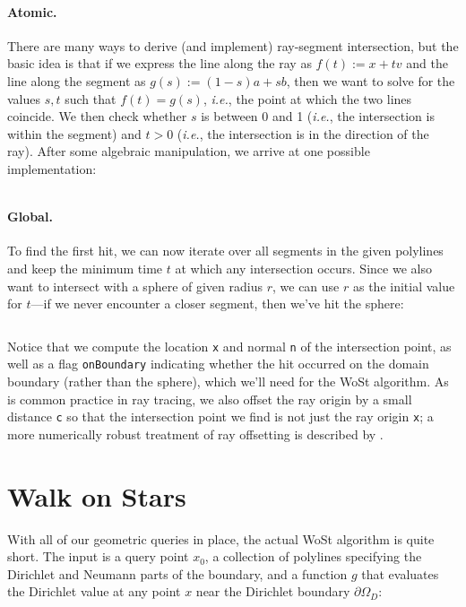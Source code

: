 \documentclass{article}
\newcommand{\code}[1]{\texttt{\small{#1}}}
\newcommand{\ie}{\emph{i.e.}} %
\renewcommand{\vec}[1]{#1}
\begin{document}
\paragraph{Atomic.} There are many ways to derive (and implement) ray-segment intersection, but the basic idea is that if we express the line along the ray as \(\vec{f}(t) := \vec{x} + t\vec{v}\) and the line along the segment as \(\vec{g}(s) := (1-s)\vec{a} + s\vec{b}\), then we want to solve for the values \(s,t\) such that \(\vec{f}(t) = \vec{g}(s)\), \ie, the point at which the two lines coincide.  We then check whether \(s\) is between 0 and 1 (\ie, the intersection is within the segment) and \(t > 0\) (\ie, the intersection is in the direction of the ray).  After some algebraic manipulation, we arrive at one possible implementation:

\inputminted[fontsize=\small,linenos,firstline=48,lastline=60,bgcolor=bg]{cpp}{../code/WoStLaplace2D.cpp}

\paragraph{Global.} To find the first hit, we can now iterate over all segments in the given polylines and keep the minimum time \(t\) at which any intersection occurs.  Since we also want to intersect with a sphere of given radius \(r\), we can use \(r\) as the initial value for \(t\)---if we never encounter a closer segment, then we've hit the sphere:

\inputminted[fontsize=\small,linenos,firstline=90,lastline=113,bgcolor=bg]{cpp}{../code/WoStLaplace2D.cpp}

Notice that we compute the location \code{x} and normal \code{n} of the intersection point, as well as a flag \code{onBoundary} indicating whether the hit occurred on the domain boundary (rather than the sphere), which we'll need for the WoSt algorithm.  As is common practice in ray tracing, we also offset the ray origin by a small distance \code{c} so that the intersection point we find is not just the ray origin \code{x}; a more numerically robust treatment of ray offsetting is described by \citet{wachter2019fast}.

\section{Walk on Stars}
\label{sec:WalkOnStars}

With all of our geometric queries in place, the actual WoSt algorithm is quite short.  The input is a query point \(\vec{x}_0\), a collection of polylines specifying the Dirichlet and Neumann parts of the boundary, and a function \(g\) that evaluates the Dirichlet value at any point \(x\) near the Dirichlet boundary \(\partial\Omega_D\):
\end{document}
